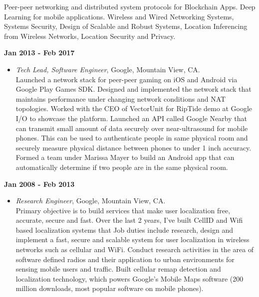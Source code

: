 

\begin{resume}
 
Peer-peer networking and distributed system protocols for Blockchain Apps.
Deep Learning for mobile applications.
Wireless and Wired Networking Systems, Systems Security, Design of Scalable and Robust
Systems, Location Inferencing from Wireless Networks, Location Security and Privacy.

{\bf Jan 2013 - Feb 2017}
    \begin{itemize}
         \item[] {\it Tech Lead, Software Engineer}, Google, Mountain View, CA.\\
             Launched a network stack for peer-peer gaming on iOS and Android via Google Play Games SDK. Designed and
             implemented the network stack that maintains performance under changing network conditions and NAT
             topologies. Worked with the CEO of VectorUnit for RipTide demo at Google I/O to showcase the platform.
             Launched an API called Google Nearby that can transmit small amount of data securely over near-ultrasound
             for mobile phones. This can be used to authenticate people in same physical room and securely measure physical distance
             between phones to under 1 inch accuracy.
             Formed a team under Marissa Mayer to build an Android app that can automatically determine if two people
             are in the same physical room.
    \end{itemize}

{\bf Jan 2008 - Feb 2013}
    \begin{itemize}
         \item[] {\it Research Engineer}, Google, Mountain View, CA.\\

	 Primary objective is to build services that make user localization free, accurate, secure and fast.
	 Over the last 2 years, I've built CellID and Wifi based localization systems that 
	 Job duties include research, design and implement a fast, secure and
	 scalable system for user localization in wireless networks such as cellular and WiFi.
	 Conduct research activities in the area of software defined radios and
	 their application to urban environments for sensing mobile users and
	 traffic. Built cellular remap detection and localization technology, which
	 powers Google's Mobile Maps software (200 million downloads, most popular
	 software on mobile phones).
	 

\end{itemize}
\end{resume}
